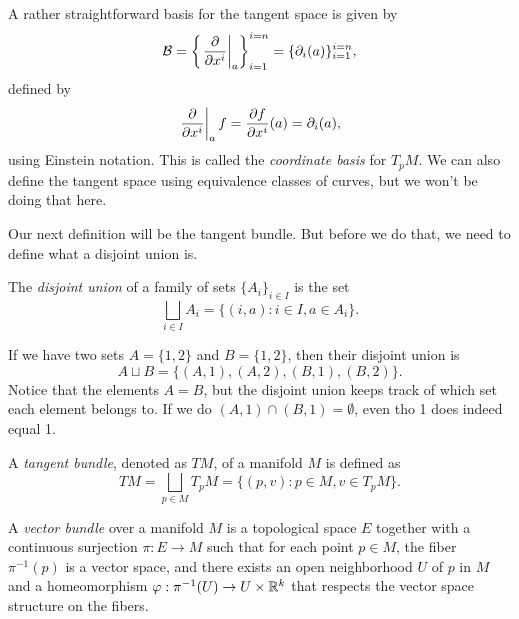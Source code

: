 
A rather straightforward basis for the tangent space is given by
\[%
  \B = \left\{\left.\pdv{}{x^i}\right\rvert_a\right\}_{i=1}^{i=n} = \{\pd{i}(a)\}_{i=1}^{i=n}
,\]%
defined by
\[%
  \left.\pdv{}{x^i}\right\rvert_a f = \pdv{f}{x^i}(a) = \pd{i}(a)
,\]%
using Einstein notation. This is called the \emph{coordinate basis} for $T_pM$. We can also define the tangent space using equivalence classes of curves, but we won't be doing that here.

Our next definition will be the tangent bundle. But before we do that, we need to define what a disjoint union is.

\begin{definition}
  The \emph{disjoint union} of a family of sets $\{A_i\}_{i \in I}$ is the set
  \[%
    \bigsqcup_{i \in I} A_i = \{(i, a) : i \in I, a \in A_i\}
  .\]%
\end{definition}

\begin{example}
  If we have two sets $A = \{1, 2\}$ and $B = \{1, 2\}$, then their disjoint union is
  \[%
    A \sqcup B = \{(A, 1), (A, 2), (B, 1), (B, 2)\}
  .\]%
  Notice that the elements $A = B$, but the disjoint union keeps track of which set each element belongs to. If we do $(A, 1) \cap (B, 1) = \emptyset$, even tho 1 does indeed equal 1.
\end{example}

\begin{definition}
  A \emph{tangent bundle}, denoted as $TM$, of a manifold $M$ is defined as
  \[%
    TM = \bigsqcup_{p \in M} T_pM = \{(p, v) : p \in M, v \in T_pM\}
  .\]%
\end{definition}



\begin{definition}
  A \emph{vector bundle} over a manifold $M$ is a topological space $E$ together with a continuous surjection $\pi : E \to M$ such that for each point $p \in M$, the fiber $\pi^{-1}(p)$ is a vector space, and there exists an open neighborhood $U$ of $p$ in $M$ and a homeomorphism $\varphi : \pi^{-1}(U) \rightarrow U \times \mathbb{R}^k$ that respects the vector space structure on the fibers.
\end{definition}

